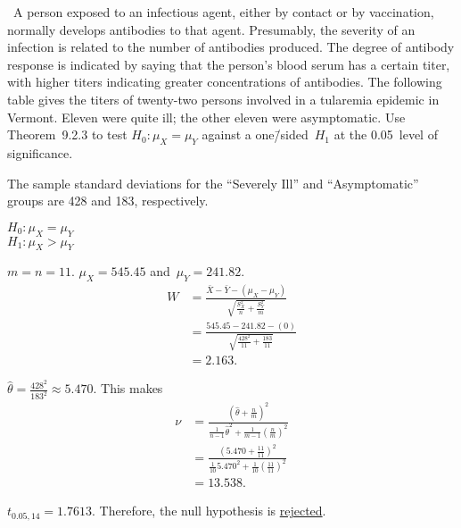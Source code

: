 \begin{problem}
  ~A person exposed to an infectious agent, either by contact or by vaccination, normally develops antibodies to that agent. Presumably, the severity of an infection is related to the number of antibodies produced. The degree of antibody response is indicated by saying that the person’s blood serum has a certain titer, with higher titers indicating greater concentrations of antibodies. The following table gives the titers of twenty-two persons involved in a tularemia epidemic in Vermont. Eleven were quite ill; the other eleven were asymptomatic. Use Theorem~9.2.3 to test ${H_0: \mu_X = \mu_Y}$ against a one\=/sided~${H_1}$ at the 0.05~level of significance.

  The sample standard deviations for the “Severely Ill” and “Asymptomatic” groups are 428 and 183, respectively.
\end{problem}

\noindent
${H_0: \mu_{X} = \mu_{Y}}$ \\
${H_1: \mu_{X} > \mu_{Y}}$

\noindent
${m = n = 11}$. ${\mu_{X} = 545.45}$ and~${\mu_{Y} = 241.82}$.
\begin{align}
  W &= \frac{\bar{X} - \bar{Y} - (\mu_{X} - \mu_{Y})}{\sqrt{\frac{S_{X}^{2}}{n} + \frac{S_{Y}^{2}}{m}}} \\
    &= \frac{545.45 - 241.82 - (0)}{\sqrt{\frac{428^2}{11}+\frac{183}{11}}} \\
    &= 2.163\text{.}
\end{align}

\noindent
${\hat{\theta} = \frac{428^2}{183^2} \approx 5.470}$.  This makes
\begin{align}
  \nu &= \frac{(\hat{\theta} + \frac{n}{m})^2}{\frac{1}{n-1}\hat{\theta}^2 + \frac{1}{m-1}\left(\frac{n}{m}\right)^2} \\
      &= \frac{\left(5.470 + \frac{11}{11}\right)^2}{\frac{1}{10} 5.470^2 + \frac{1}{10}\left(\frac{11}{11}\right)^2} \\
      &= 13.538 \text{.}
\end{align}

\noindent
${t_{0.05,14} = 1.7613}$.  Therefore, the null hypothesis is \underline{rejected}.
